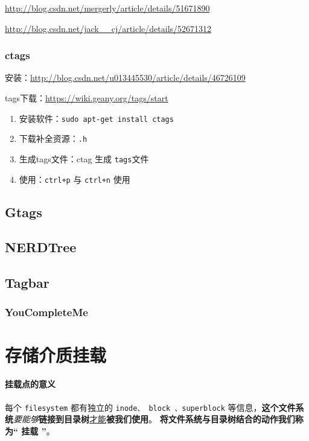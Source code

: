 \documentclass[UTF8,a4paper,12pt]{ctexbook}
\begin{document}
			
			\url{http://blog.csdn.net/mergerly/article/details/51671890}
			
			\url{http://blog.csdn.net/jack__cj/article/details/52671312}
			\subsubsection{ctags}
				安装：\url{http://blog.csdn.net/u013445530/article/details/46726109}
				
				tags下载：\url{https://wiki.geany.org/tags/start}
				\begin{enumerate}
					\item 安装软件：\verb|sudo apt-get install ctags|
					\item 下载补全资源：\verb|.h|
					\item 生成tags文件：ctag 生成 \verb|tags|文件
					\item 使用：\verb|ctrl+p| 与 \verb|ctrl+n| 使用
				\end{enumerate}
			
			\subsection{Gtags}
				
			\subsection{NERDTree}
			
			\subsection{Tagbar}
			
			\subsubsection{YouCompleteMe}
				
	\section{存储介质挂载}
		\paragraph{挂载点的意义}
			每个 \verb|filesystem| 都有独立的 \verb|inode、 block 、superblock| 等信息，\textbf{这个文件系统}\textit{要能够}\textbf{链接到目录树}\underline{才能}\textbf{被我们使用}。 \textbf{将文件系统与目录树结合的动作我们称为“ 挂载 ”}。 
			
\end{document}
